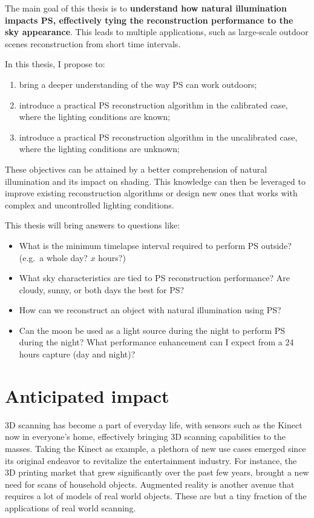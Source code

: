 The main goal of this thesis is to \textbf{understand how natural illumination impacts PS, effectively tying the reconstruction performance to the sky appearance}. This leads to multiple applications, such as large-scale outdoor scenes reconstruction from short time intervals.

In this thesis, I propose to:
\begin{enumerate}
  \item bring a deeper understanding of the way PS can work outdoors;
  \item introduce a practical PS reconstruction algorithm in the calibrated case, where the lighting conditions are known;
  \item introduce a practical PS reconstruction algorithm in the uncalibrated case, where the lighting conditions are unknown;
\end{enumerate}
These objectives can be attained by a better comprehension of natural illumination and its impact on shading. This knowledge can then be leveraged to improve existing reconstruction algorithms or design new ones that works with complex and uncontrolled lighting conditions.

This thesis will bring answers to questions like:
\begin{itemize}
  \item What is the minimum timelapse interval required to perform PS outside? (e.g.\ a whole day? $x$ hours?)
  \item What sky characteristics are tied to PS reconstruction performance? Are cloudy, sunny, or both days the best for PS?
  \item How can we reconstruct an object with natural illumination using PS?
  \item Can the moon be used as a light source during the night to perform PS during the night? What performance enhancement can I expect from a 24 hours capture (day and night)?
\end{itemize}

\section{Anticipated impact}

3D scanning has become a part of everyday life, with sensors such as the Kinect now in everyone's home, effectively bringing 3D scanning capabilities to the masses. Taking the Kinect as example, a plethora of new use cases emerged since its original endeavor to revitalize the entertainment industry. For instance, the 3D printing market that grew significantly over the past few years, brought a new need for scans of household objects. Augmented reality is another avenue that requires a lot of models of real world objects. These are but a tiny fraction of the applications of real world scanning.

